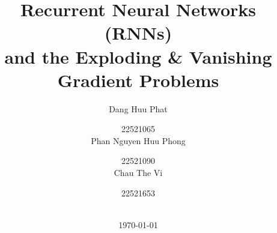 \documentclass[11pt,]{beamer}
\title[CS115 - Math for Computer Science]{Recurrent Neural Networks (RNNs) \\ and the Exploding \& Vanishing Gradient Problems} %
\author[Team 2]{
                    Dang Huu Phat \and 22521065 \\
                    Phan Nguyen Huu Phong \and 22521090 \\
                    Chau The Vi \and 22521653 \\} %
\institute[UIT]{\fontsize{10}{12}\selectfont \textbf{University of Information Technology} \\ \smallskip \textit{}} %
\date[\today]{ \\ \today} %
\begin{document}
\setcounter{tocdepth}{1}
\begin{frame}
	\titlepage %
\end{frame}


\end{document}
